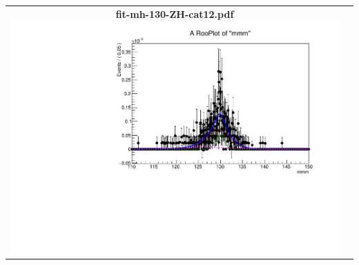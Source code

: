 \begin{longtable}{|c|c|}
{}
 \\
\hline
\parbox{0.49\textwidth}{
\centering
{\bfseries fit-mh-130-ZH-cat12.pdf}
\includegraphics[width=.49\textwidth]{figures/signal_model/AppendixBdt/ZH/130/fit_mh_130_ZH_cat12.pdf}
}
 & \\ \hline
\end{longtable}
